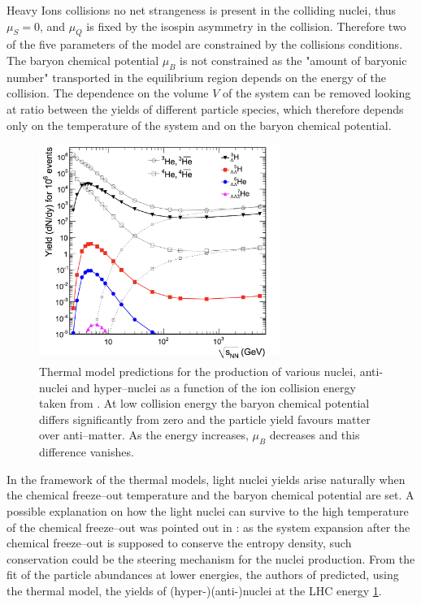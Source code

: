 Heavy Ions collisions no net strangeness is present in the colliding nuclei, thus 
$\mu_S = 0$, and $\mu_Q$ is fixed by the isospin asymmetry in the collision.
Therefore two of the five parameters of the model are constrained by the collisions
conditions.
The baryon chemical potential $\mu_B$ is not constrained as the "amount of baryonic number"
transported in the equilibrium region depends on the energy of the collision.
The dependence on the volume $V$ of the system can be removed looking at ratio between 
the yields of different particle species, which therefore depends only on the temperature 
of the system and on the baryon chemical potential.
\begin{figure} 
    \centering
    \includegraphics[width=0.7\textwidth]{gfx/yields}
    \caption{Thermal model predictions for the production of various nuclei, anti-nuclei and hyper–nuclei as a function of the ion collision energy taken from \cite{yields}. At low collision energy the baryon chemical potential differs significantly from zero and the particle yield favours matter over anti–matter. As the energy increases, $\mu_{B}$ decreases and this difference vanishes.
}
\label{fig:aliceyields}
\end{figure}
In the framework of the thermal models, light nuclei yields arise naturally when the chemical 
freeze–out temperature and the baryon chemical potential are set.
A possible explanation on how the light nuclei can survive to the high temperature of the chemical 
freeze–out was pointed out in \cite{yields}: as the system expansion after the chemical freeze–out
is supposed to conserve the entropy density, such conservation could be the steering mechanism for 
the nuclei production. From the fit of the particle abundances at lower energies, the 
authors of \cite{yields} predicted, using the thermal model, the yields of (hyper-)(anti-)nuclei 
at the LHC energy \ref{fig:aliceyields}.

